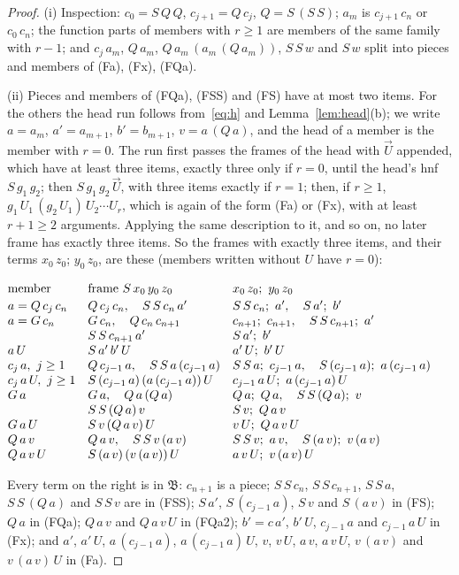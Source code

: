 \documentclass[11pt]{amsart}
\theoremstyle{definition}
\newcommand{\B}{\mathfrak B}
\newcommand{\vU}{\vec U}
\begin{document}
\begin{proof}
(i) Inspection: $c_0=S\,Q\,Q$, $c_{j+1}=Q\,c_j$, $Q=S\,(S\,S)$; $a_m$ is $c_{j+1}\,c_n$ or $c_0\,c_n$;
the function parts of members with $r\ge1$ are members of the same family with $r-1$; and
$c_j\,a_m$, $Q\,a_m$, $Q\,a_m\,(a_m\,(Q\,a_m))$, $S\,S\,w$ and $S\,w$ split into pieces and members of
(Fa), (Fx), (FQa).

(ii) Pieces and members of (FQa), (FSS) and (FS) have at most two items. For the others the head run
follows from~\eqref{eq:h} and Lemma~\ref{lem:head}(b); we write $a=a_m$, $a'=a_{m+1}$, $b'=b_{m+1}$,
$v=a\,(Q\,a)$, and the head of a member is the member with $r=0$. The run first passes the frames of the head
with $\vU$ appended, which have at least three items, exactly three only if $r=0$, until the head's
hnf $S\,g_1\,g_2$; then $S\,g_1\,g_2\,\vU$, with three items exactly if $r=1$; then, if $r\ge1$,
$g_1\,U_1\,(g_2\,U_1)\,U_2\cdots U_r$, which is again of the form (Fa) or (Fx), with at least $r+1\ge2$
arguments. Applying the same description to it, and so on, no later frame has exactly three items. So the frames with exactly three items, and
their terms $x_0\,z_0$; $y_0\,z_0$, are these (members written without $U$ have $r=0$):
\begin{center}\small$
\begin{array}{@{}lll@{}}
\text{member} & \text{frame } S\,x_0\,y_0\,z_0 & x_0\,z_0;\ y_0\,z_0\\[2pt]
a=Q\,c_j\,c_n & Q\,c_j\,c_n,\quad S\,S\,c_n\,a' & S\,S\,c_n;\ a',\quad S\,a';\ b'\\
a=G\,c_n & G\,c_n,\quad Q\,c_n\,c_{n+1} & c_{n+1};\ c_{n+1},\quad S\,S\,c_{n+1};\ a'\\
 & S\,S\,c_{n+1}\,a' & S\,a';\ b'\\
a\,U & S\,a'\,b'\,U & a'\,U;\ b'\,U\\
c_j\,a,\ j\ge1 & Q\,c_{j-1}\,a,\quad S\,S\,a\,(c_{j-1}\,a) & S\,S\,a;\ c_{j-1}\,a,\quad S\,(c_{j-1}\,a);\ a\,(c_{j-1}\,a)\\
c_j\,a\,U,\ j\ge1 & S\,(c_{j-1}\,a)\,(a\,(c_{j-1}\,a))\,U & c_{j-1}\,a\,U;\ a\,(c_{j-1}\,a)\,U\\
G\,a & G\,a,\quad Q\,a\,(Q\,a) & Q\,a;\ Q\,a,\quad S\,S\,(Q\,a);\ v\\
 & S\,S\,(Q\,a)\,v & S\,v;\ Q\,a\,v\\
G\,a\,U & S\,v\,(Q\,a\,v)\,U & v\,U;\ Q\,a\,v\,U\\
Q\,a\,v & Q\,a\,v,\quad S\,S\,v\,(a\,v) & S\,S\,v;\ a\,v,\quad S\,(a\,v);\ v\,(a\,v)\\
Q\,a\,v\,U & S\,(a\,v)\,(v\,(a\,v))\,U & a\,v\,U;\ v\,(a\,v)\,U
\end{array}$
\end{center}
Every term on the right is in $\B$: $c_{n+1}$ is a piece; $S\,S\,c_n$, $S\,S\,c_{n+1}$, $S\,S\,a$,
$S\,S\,(Q\,a)$ and $S\,S\,v$ are in (FSS); $S\,a'$, $S\,(c_{j-1}\,a)$, $S\,v$ and $S\,(a\,v)$ in (FS);
$Q\,a$ in (FQa); $Q\,a\,v$ and $Q\,a\,v\,U$ in (FQa2); $b'=c\,a'$, $b'\,U$, $c_{j-1}\,a$ and $c_{j-1}\,a\,U$ in
(Fx); and $a'$, $a'\,U$, $a\,(c_{j-1}\,a)$, $a\,(c_{j-1}\,a)\,U$, $v$, $v\,U$, $a\,v$, $a\,v\,U$,
$v\,(a\,v)$ and $v\,(a\,v)\,U$ in (Fa).
\end{proof}
\end{document}
